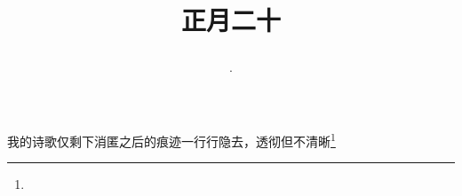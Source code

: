 \title{\date[d=29,m=2,y=2024][year:cn-y,年,month:cn,day:cn,日,·,weekday]·正月二十 }
我的诗歌仅剩下消匿之后的痕迹一行行隐去，透彻但不清晰\footnote{ }

